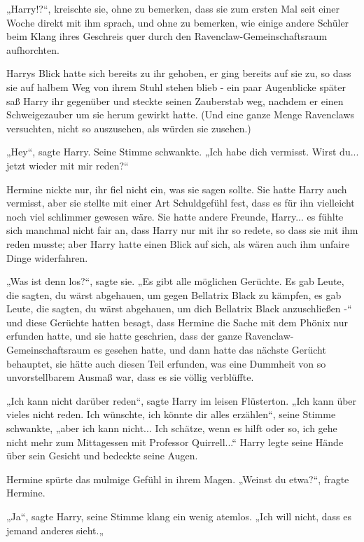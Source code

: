{„Harry!?“, kreischte sie, ohne zu bemerken, dass sie zum ersten Mal seit einer Woche direkt mit ihm sprach, und ohne zu bemerken, wie einige andere Schüler beim Klang ihres Geschreis quer durch den Ravenclaw-Gemeinschaftsraum aufhorchten.

Harrys Blick hatte sich bereits zu ihr gehoben, er ging bereits auf sie zu, so dass sie auf halbem Weg von ihrem Stuhl stehen blieb - ein paar Augenblicke später saß Harry ihr gegenüber und steckte seinen Zauberstab weg, nachdem er einen Schweigezauber um sie herum gewirkt hatte. (Und eine ganze Menge Ravenclaws versuchten, nicht so auszusehen, als würden sie zusehen.)

„Hey“, sagte Harry. Seine Stimme schwankte. „Ich habe dich vermisst. Wirst du... jetzt wieder mit mir reden?“

Hermine nickte nur, ihr fiel nicht ein, was sie sagen sollte. Sie hatte Harry auch vermisst, aber sie stellte mit einer Art Schuldgefühl fest, dass es für ihn vielleicht noch viel schlimmer gewesen wäre. Sie hatte andere Freunde, Harry... es fühlte sich manchmal nicht fair an, dass Harry nur mit ihr so redete, so dass sie mit ihm reden musste; aber Harry hatte einen Blick auf sich, als wären auch ihm unfaire Dinge widerfahren.

„Was ist denn los?“, sagte sie. „Es gibt alle möglichen Gerüchte. Es gab Leute, die sagten, du wärst abgehauen, um gegen Bellatrix Black zu kämpfen, es gab Leute, die sagten, du wärst abgehauen, um dich Bellatrix Black anzuschließen -“ und diese Gerüchte hatten besagt, dass Hermine die Sache mit dem Phönix nur erfunden hatte, und sie hatte geschrien, dass der ganze Ravenclaw-Gemeinschaftsraum es gesehen hatte, und dann hatte das nächste Gerücht behauptet, sie hätte auch diesen Teil erfunden, was eine Dummheit von so unvorstellbarem Ausmaß war, dass es sie völlig verblüffte.

„Ich kann nicht darüber reden“, sagte Harry im leisen Flüsterton. „Ich kann über vieles nicht reden. Ich wünschte, ich könnte dir alles erzählen“, seine Stimme schwankte, „aber ich kann nicht... Ich schätze, wenn es hilft oder so, ich gehe nicht mehr zum Mittagessen mit Professor Quirrell...“ Harry legte seine Hände über sein Gesicht und bedeckte seine Augen.

Hermine spürte das mulmige Gefühl in ihrem Magen. „Weinst du etwa?“, fragte Hermine.

„Ja“, sagte Harry, seine Stimme klang ein wenig atemlos. „Ich will nicht, dass es jemand anderes sieht.„

}
